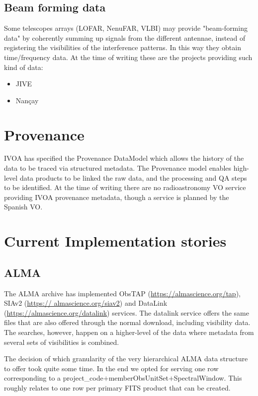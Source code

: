 \documentclass[11pt,a4paper]{ivoatex/ivoa}
\begin{document}
{\subsection{Beam forming data}
Some telescopes arrays (LOFAR, NenuFAR, VLBI) may provide "beam-forming data" by coherently summing up 
signals from the different antennae, instead of registering the visibilities of the interference 
patterns. In this way they obtain time/frequency data. At the time of writing these are the projects 
providing such kind of data:
\begin{itemize}
\item JIVE
\item Nan\c cay
\end{itemize}
\section{Provenance}

IVOA has specified the Provenance DataModel \citep{2020ivoa.spec.0411S} which allows the history of the 
data to be traced via structured metadata. The Provenance model enables high-level data products to be 
linked the raw data, and the processing and QA steps to be identified. At the time of writing there are 
no radioastronomy VO service providing IVOA provenance metadata, though a service is planned by the 
Spanish VO.   

%



\appendix
\section{ Current Implementation stories}

\subsection{ALMA}
\label{sec:ALMA}
The ALMA archive has implemented ObsTAP (\url{https://almascience.org/tap}), SIAv2 (\url{https://
almascience.org/siav2}) and DataLink (\url{https://almascience.org/datalink}) services.
The datalink service offers the same files that are also offered through the normal download, including 
visibility data. The searches, however, happen on a higher-level of the data where metadata from several 
sets of visibilities is combined.

The decision of which granularity of the very hierarchical ALMA data
structure to offer took quite some time. In the end we opted for serving
one row corresponding to a project\_code$+$memberObsUnitSet$+$SpectralWindow. This roughly relates to 
one row per primary FITS product that can be created.

}
\end{document}
